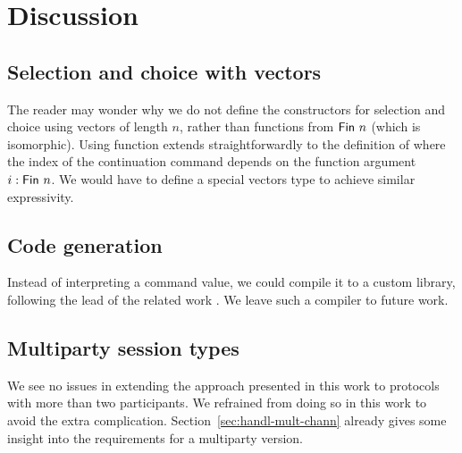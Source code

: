 \documentclass[acmsmall,screen,anonymous,review]{acmart}
\begin{document}
\newpage

\section{Discussion}
\label{sec:discussion}


\subsection{Selection and choice with vectors}
\label{sec:select-choice-with}

The reader may wonder why we do not define the constructors for
selection and choice using vectors of length $n$, rather than
functions from $\AFin~n$ (which is isomorphic). Using function extends
straightforwardly to the definition of {\ACommand} where the {\ASession} index of the
continuation command depends on the function argument $i : \AFin~n$.
We would have to define a special vectors type to achieve similar
expressivity. 

\subsection{Code generation}
\label{sec:code-generation}

Instead of interpreting a command value, we could compile it to a
custom library, following the lead of the related work
\cite{DBLP:journals/pacmpl/00020HNY20,DBLP:conf/cc/Miu0Y021}.
We leave such a compiler to future work.

\subsection{Multiparty session types}
\label{sec:mult-sess-types}

We see no issues in extending the approach presented in this work to
protocols with more than two participants. We refrained from doing so
in this work to avoid the extra
complication. Section~\ref{sec:handl-mult-chann} already gives some
insight into the requirements for a multiparty version.






\end{document}
